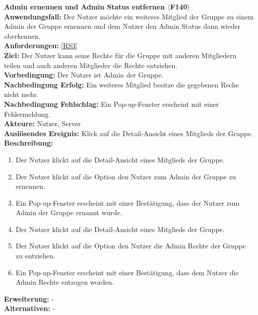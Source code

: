 \documentclass[parskip=full]{scrartcl}
\begin{document}
\textbf{Admin ernennen und Admin Status entfernen $\langle$F140$\rangle$}\\
\textbf{Anwendungsfall:} Der Nutzer möchte ein weiteres Mitglied der Gruppe zu einem Admin der Gruppe ernennen und dem Nutzer den Admin Status dann wieder aberkennen.\\
\textbf{Anforderungen:} \ref{RS3}\\
\textbf{Ziel:} Der Nutzer kann seine Rechte für die Gruppe mit anderen Mitgliedern teilen und auch anderen Mitglieder die Rechte entziehen.\\
\textbf{Vorbedingung:} Der Nutzer ist Admin der Gruppe.\\
\textbf{Nachbedingung Erfolg:} Ein weiteres Mitglied besitze die gegebenen Reche nicht mehr.\\
\textbf{Nachbedingung Fehlschlag:} Ein Pop-up-Fenster erscheint mit einer Fehlermeldung.\\
\textbf{Akteure:} Nutzer, Server \\
\textbf{Auslösendes Ereignis:} Klick auf die Detail-Ansicht eines Mitglieds der Gruppe.\\
\textbf{Beschreibung:}
\begin{enumerate}
    \item Der Nutzer klickt auf die Detail-Ansicht eines Mitglieds der Gruppe.
    \item Der Nutzer klickt auf die Option den Nutzer zum Admin der Gruppe zu ernennen.
    \item Ein Pop-up-Fenster erscheint mit einer Bestätigung, dass der Nutzer zum Admin der Gruppe ernannt wurde.
    \item Der Nutzer klickt auf die Detail-Ansicht eines Mitglieds der Gruppe.
    \item Der Nutzer klickt auf die Option den Nutzer die Admin Rechte der Gruppe zu entziehen.
    \item Ein Pop-up-Fenster erscheint mit einer Bestätigung, dass dem Nutzer die Admin Rechte entzogen worden.
\end{enumerate}
\textbf{Erweiterung:} -\\
\textbf{Alternativen:} -
\newpage
\end{document}
